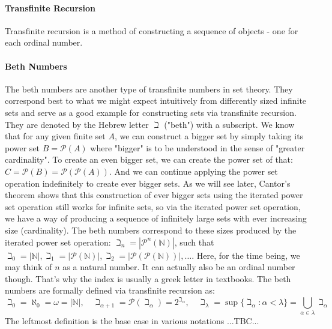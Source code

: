 \paragraph{Transfinite Recursion}
Transfinite recursion is a method of constructing a sequence of objects - one for each ordinal number.






\paragraph{Beth Numbers}
The beth numbers are another type of transfinite numbers in set theory. They correspond best to what we might expect intuitively from differently sized infinite sets and serve as a good example for constructing sets via transfinite recursion. They are denoted by the Hebrew letter $\beth$ ("beth") with a subscript. We know that for any given finite set $A$, we can construct a bigger set by simply taking its power set $B = \mathcal{P}(A)$ where "bigger" is to be understood in the sense of "greater cardinality". To create an even bigger set, we can create the power set of that: $C = \mathcal{P}(B) = \mathcal{P}(\mathcal{P}(A))$. And we can continue applying the power set operation indefinitely to create ever bigger sets. As we will see later, Cantor's theorem shows that this construction of ever bigger sets using the iterated power set operation still works for infinite sets, so via the iterated power set operation, we have a way of producing a sequence of infinitely large sets with ever increasing size (cardinality). The beth numbers correspond to these sizes produced by the iterated power set operation: $\beth_n = |\mathcal{P}^n (\mathbb{N})|$, such that $\beth_0 = |\mathbb{N}|, \beth_1 = |\mathcal{P} (\mathbb{N})|, \beth_2 = |\mathcal{P}(\mathcal{P} (\mathbb{N}))|, \ldots$. Here, for the time being, we may think of $n$ as a natural number. It can actually also be an ordinal number though. That's why the index is usually a greek letter in textbooks. The beth numbers are formally defined via transfinite recursion as:
\begin{equation}
\beth_0 = \aleph_0 
        = \omega 
        = |\mathbb{N}|, \quad
\beth_{\alpha + 1} = \mathcal{P}(\beth_{\alpha}) 
                   = 2^{\beth_{\alpha}}, \quad
\beth_{\lambda} = \sup \{ \beth_{\alpha} : \alpha < \lambda \} 
                = \bigcup_{\alpha \in \lambda} \beth_{\alpha} 
\end{equation}
The leftmost definition is the base case in various notations
...TBC...

